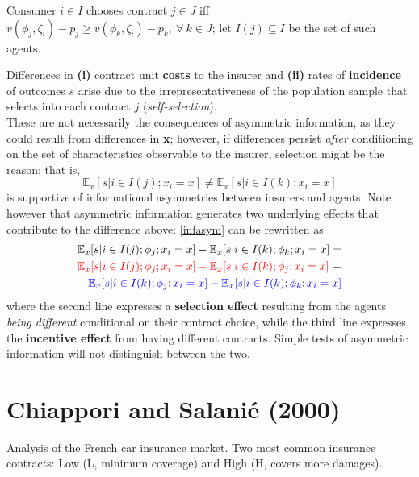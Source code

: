 \documentclass[11pt]{article}
\numberwithin{equation}{section}
\begin{document}
Consumer $i \in I$ chooses contract $j \in J$ iff $v(\phi_j, \zeta_i) - p_j \geq v(\phi_k, \zeta_i)
 - p_k, ~\forall~ k \in J$; let $I(j) \subseteq I$ be the set of such agents.

 Differences in \textbf{(i)} contract unit \textbf{costs} to the insurer and \textbf{(ii)} rates of \textbf{incidence} of outcomes $s$ arise due to the irrepresentativeness of the population sample that selects into each contract $j$ (\textit{self-selection}). \\
 These are not necessarily the consequences of asymmetric information, as they could result from differences in \textbf{x}; however, if differences persist \textit{after} conditioning on the set of characteristics observable to the insurer, selection might be the reason: that is,
\begin{equation}
\label{infasym}
	\mathbb{E}_x[s|i \in I(j); x_i = x] \neq \mathbb{E}_x[s|i \in I(k); x_i = x]
\end{equation}
 is supportive of informational asymmetries between insurers and agents. Note however that asymmetric information generates two underlying effects that contribute to the difference above: \eqref{infasym} can be rewritten as
  	\begin{equation}
 \label{decomposition}
	\begin{split}
 	\mathbb{E}_x[s|i \in I(j);\phi_j; x_i = x] - \mathbb{E}_x[s|i \in I(k);\phi_k; x_i = x] = \\ \color{red}{\mathbb{E}_x[s|i \in I(j);\phi_j; x_i = x] - \mathbb{E}_x[s|i \in I(k);\phi_j; x_i = x]} ~\color{black}{+} \\ \color{blue} {\mathbb{E}_x[s|i \in I(k);\phi_j; x_i = x] - \mathbb{E}_x[s|i \in I(k);\phi_k; x_i = x]}
	\end{split}
 \end{equation}
  where the second line expresses a \textbf{selection effect} resulting from the agents \textit{being different} conditional on their contract choice, while the third line expresses the \textbf{incentive effect} from having different contracts. Simple tests of asymmetric information will not distinguish between the two.

  \section{Chiappori and Salani\'{e} (2000)}

Analysis of the French car insurance market. Two most common insurance contracts: Low (L, minimum coverage) and High (H, covers more damages).
\end{document}
